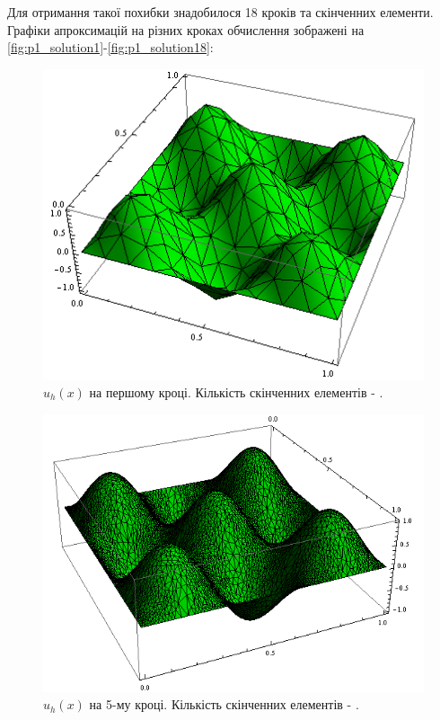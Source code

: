 Для отримання такої похибки знадобилося 18 кроків та  скінченних елементи. Графіки апроксимацій на різних кроках обчислення зображені на \autoref{fig:p1_solution1}-\ref{fig:p1_solution18}:
%
\begin{figure}[H]
	\centering
    \includegraphics[scale=0.9]{problem1/my/solutions/1}
    \caption{$u_h(x)$ на першому кроці. Кількість скінченних елементів - .}
    \label{fig:p1_solution1}
\end{figure}
%
\begin{figure}[H]
	\centering
    \includegraphics[scale=0.7]{problem1/my/solutions/5}
    \caption{$u_h(x)$ на 5-му кроці. Кількість скінченних елементів - .}
    \label{fig:p1_solution5}
\end{figure}
%
